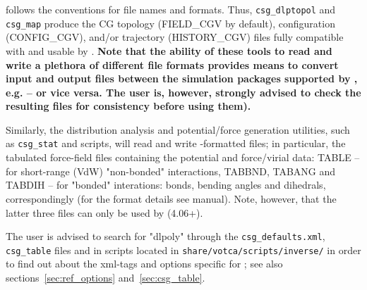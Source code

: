 \votca follows the \dlpoly conventions for file names and formats. Thus, \texttt{csg\_dlptopol} 
and \texttt{csg\_map} produce the CG topology (FIELD\_CGV by default), configuration (CONFIG\_CGV), 
and/or trajectory (HISTORY\_CGV) files fully compatible with and usable by \dlpoly. 
{\bf Note that the ability of these tools to read and write a plethora of different file formats 
provides means to convert input and output files between the simulation packages supported 
by \votca, e.g. \gromacs -- \dlpoly or vice versa. The user is, however, strongly advised 
to check the resulting files for consistency before using them).}

Similarly, the distribution analysis and potential/force generation utilities, such as \texttt{csg\_stat} 
and \votca scripts, will read and write \dlpoly-formatted files; in particular, the tabulated 
force-field files containing the potential and force/virial data: TABLE -- for short-range (VdW) 
"non-bonded" interactions, TABBND, TABANG and TABDIH -- for "bonded" interations: bonds, bending 
angles and dihedrals, correspondingly (for the format details see \dlpolyfour manual). Note, however, 
that the latter three files can only be used by \dlpolyfour (4.06+). 

The user is advised to search for "dlpoly" through the \texttt{csg\_defaults.xml}, \texttt{csg\_table} 
files and in scripts located in \texttt{share/votca/scripts/inverse/} in order to find out about 
the xml-tags and options specific for \dlpoly; see also sections~\ref{sec:ref_options} 
and~\ref{sec:csg_table}.



